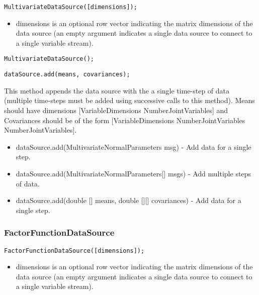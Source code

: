 
\ifmatlab
\begin{lstlisting}
MultivariateDataSource([dimensions]);
\end{lstlisting}

\begin{itemize}
\item dimensions is an optional row vector indicating the matrix dimensions of the data source (an empty argument indicates a single data source to connect to a single variable stream).
\end{itemize}
\fi

\ifjava
\begin{lstlisting}
MultivariateDataSource();
\end{lstlisting}
\fi



\ifmatlab
\begin{lstlisting}
dataSource.add(means, covariances);
\end{lstlisting}

This method appends the data source with the a single time-step of data (multiple time-steps must be added using successive calls to this method).  Means should have dimensions [VariableDimensions NumberJointVariables] and Covariances should be of the form [VariableDimensions NumberJointVariables NumberJointVariables].
\fi

\ifjava
\begin{itemize}
\item dataSource.add(MultivariateNormalParameters msg) - Add data for a single step.
\item dataSource.add(MultivariateNormalParameters[] msgs) - Add multiple steps of data.
\item dataSource.add(double [] means, double [][] covariances) - Add data for a single step.
\end{itemize}
\fi


\subsubsection{FactorFunctionDataSource}


\ifmatlab
\begin{lstlisting}
FactorFunctionDataSource([dimensions]);
\end{lstlisting}

\begin{itemize}
\item dimensions is an optional row vector indicating the matrix dimensions of the data source (an empty argument indicates a single data source to connect to a single variable stream).
\end{itemize}
\fi

